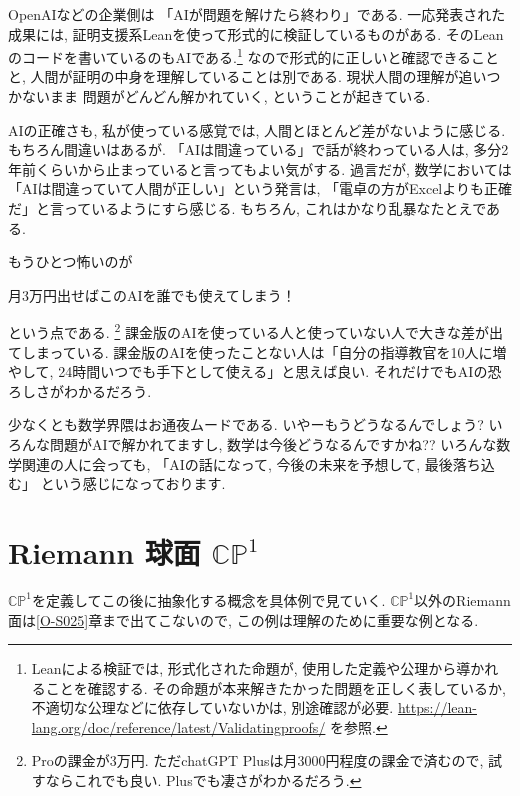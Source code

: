 \documentclass[dvipdfmx,a4paper,11pt]{article} %
\newcommand{\C}{\mathbb{C}}
\theoremstyle{definition}
\numberwithin{equation}{section}
\begin{document}
OpenAIなどの企業側は
「AIが問題を解けたら終わり」である. 
一応発表された成果には,
証明支援系Leanを使って形式的に検証しているものがある.
そのLeanのコードを書いているのもAIである.\footnote{Leanによる検証では,
形式化された命題が, 使用した定義や公理から導かれることを確認する.
その命題が本来解きたかった問題を正しく表しているか,
不適切な公理などに依存していないかは, 別途確認が必要.
\url{https://lean-lang.org/doc/reference/latest/Validatingproofs/}
を参照.}
なので形式的に正しいと確認できることと,
人間が証明の中身を理解していることは別である.
現状人間の理解が追いつかないまま
問題がどんどん解かれていく, ということが起きている.


AIの正確さも, 私が使っている感覚では,
人間とほとんど差がないように感じる.
もちろん間違いはあるが.
「AIは間違っている」で話が終わっている人は,
多分2年前くらいから止まっていると言ってもよい気がする.
過言だが, 数学においては
「AIは間違っていて人間が正しい」という発言は,
「電卓の方がExcelよりも正確だ」と言っているようにすら感じる.
もちろん, これはかなり乱暴なたとえである.

もうひとつ怖いのが
\begin{tcolorbox}[mybox]
\begin{center}
月3万円出せばこのAIを誰でも使えてしまう！
\end{center}
\end{tcolorbox}
という点である. \footnote{Proの課金が3万円. ただchatGPT Plusは月3000円程度の課金で済むので, 試すならこれでも良い. Plusでも凄さがわかるだろう.}
課金版のAIを使っている人と使っていない人で大きな差が出てしまっている. 
課金版のAIを使ったことない人は「自分の指導教官を10人に増やして, 24時間いつでも手下として使える」と思えば良い. それだけでもAIの恐ろしさがわかるだろう. 

少なくとも数学界隈はお通夜ムードである.
いやーもうどうなるんでしょう?
いろんな問題がAIで解かれてますし,
数学は今後どうなるんですかね??
いろんな数学関連の人に会っても,
「AIの話になって, 今後の未来を予想して, 最後落ち込む」
という感じになっております.



\newpage


\newpage
\section{Riemann 球面 $\C\mathbb P^1$}\label{O-S001}

$\C\mathbb P^1$を定義してこの後に抽象化する概念を具体例で見ていく. 
$\C\mathbb P^1$以外のRiemann 面は\ref{O-S025}章まで出てこないので, この例は理解のために重要な例となる. 
\end{document}
